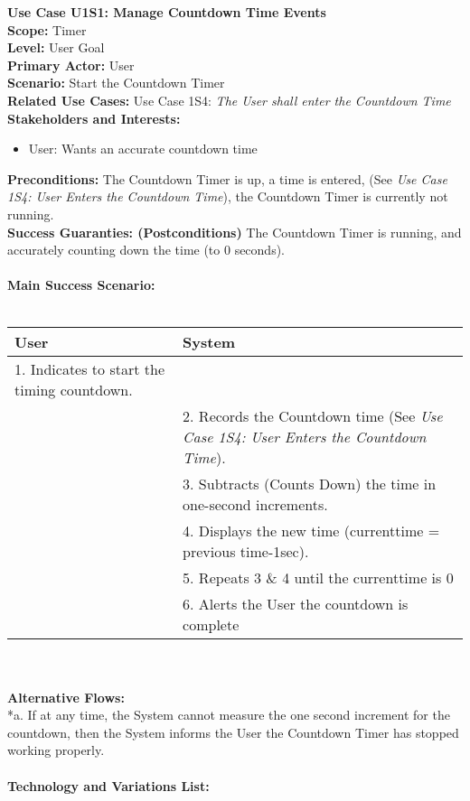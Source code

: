 \documentclass[letterpaper]{article}
\begin{document}
\noindent
\textbf{Use Case U1S1:  Manage Countdown Time Events}\\
\textbf{Scope:  }Timer\\
\textbf{Level:  }User Goal\\
\textbf{Primary Actor:  }User\\
\textbf{Scenario:  }Start the Countdown Timer\\
\textbf{Related Use Cases:  }Use Case 1S4:  \textit{The User shall
enter the Countdown Time}\\
\textbf{Stakeholders and Interests:}
\begin{itemize}
\item User:  Wants an accurate countdown time
\end{itemize}
\textbf{Preconditions:  }The Countdown Timer is up, a time is entered,
(See \emph{Use Case 1S4: User Enters the Countdown Time}), the Countdown Timer
is currently not running.\\
\textbf{Success Guaranties:  (Postconditions)} 
The Countdown Timer is running, and accurately counting down the time
(to 0 seconds).\\\\
\textbf{Main Success Scenario: }\\\\
\begin{tabular}{|p{6cm}|p{6cm}|}\hline
\textbf{User} & \textbf{System}\\\hline
1.  Indicates to start the timing countdown. & \\\hline
&2.  Records the Countdown time (See \textit{Use Case 1S4:  User Enters the 
Countdown Time}).\\\hline
&3.  Subtracts (Counts Down) the time in one-second increments.\\\hline
&4.  Displays the new time (currenttime = previous time-1sec).\\\hline
&5. Repeats 3 \& 4 until the currenttime is 0\\\hline
&6. Alerts the User the countdown is complete\\\hline
\end{tabular}\\\\
\textbf{Alternative Flows:  }\\
*a.  If at any time, the System cannot measure the one second increment
for the countdown, then the System informs the User the Countdown Timer
has stopped working properly.\\\\
\textbf{Technology and Variations List:  }\\
\end{document}
